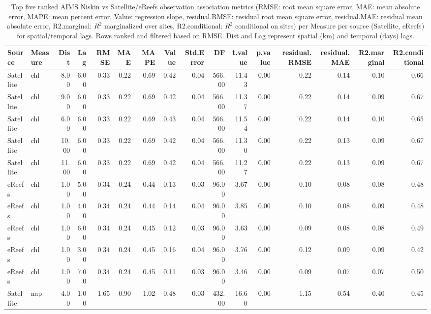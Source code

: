 \begin{table}[ht]
\centering
\caption{Top five ranked AIMS Niskin vs Satellite/eReefs observation association metrics (RMSE: root mean square error, MAE: mean absolute error, MAPE: mean percent error, Value: regression slope, residual.RMSE: residual root mean square error, residual.MAE: residual mean absolute error, R2.marginal: $R^2$ marginalized over sites, R2.conditional: $R^2$ conditional on sites) per Measure per source (Satellite, eReefs) for spatial/temporal lags.  Rows ranked and filtered based on RMSE. Dist and Lag represent spatial (km) and temporal (days) lags.} 
\label{tab:comp.all.rmse.sum.max}
\begingroup\scriptsize
\begin{tabular}{llrrrrrrrrrrrrrr}
  \toprule
Source & Measure & Dist & Lag & RMSE & MAE & MAPE & Value & Std.Error & DF & t.value & p.value & residual.RMSE & residual.MAE & R2.marginal & R2.conditional \\ 
  \midrule
Satellite & chl & 8.00 & 6.00 & 0.33 & 0.22 & 0.69 & 0.42 & 0.04 & 566.00 & 11.43 & 0.00 & 0.22 & 0.14 & 0.10 & 0.66 \\ 
  Satellite & chl & 9.00 & 6.00 & 0.33 & 0.22 & 0.69 & 0.42 & 0.04 & 566.00 & 11.37 & 0.00 & 0.22 & 0.14 & 0.09 & 0.67 \\ 
  Satellite & chl & 6.00 & 6.00 & 0.33 & 0.22 & 0.69 & 0.43 & 0.04 & 566.00 & 11.54 & 0.00 & 0.22 & 0.14 & 0.10 & 0.65 \\ 
  Satellite & chl & 10.00 & 6.00 & 0.33 & 0.22 & 0.69 & 0.42 & 0.04 & 566.00 & 11.30 & 0.00 & 0.22 & 0.13 & 0.09 & 0.67 \\ 
  Satellite & chl & 11.00 & 6.00 & 0.33 & 0.22 & 0.69 & 0.42 & 0.04 & 566.00 & 11.27 & 0.00 & 0.22 & 0.13 & 0.09 & 0.67 \\ 
  eReefs & chl & 1.00 & 5.00 & 0.34 & 0.24 & 0.44 & 0.13 & 0.03 & 96.00 & 3.67 & 0.00 & 0.10 & 0.08 & 0.08 & 0.48 \\ 
  eReefs & chl & 1.00 & 4.00 & 0.34 & 0.24 & 0.44 & 0.14 & 0.04 & 96.00 & 3.85 & 0.00 & 0.10 & 0.08 & 0.09 & 0.48 \\ 
  eReefs & chl & 1.00 & 6.00 & 0.34 & 0.24 & 0.45 & 0.12 & 0.03 & 96.00 & 3.63 & 0.00 & 0.09 & 0.08 & 0.08 & 0.49 \\ 
  eReefs & chl & 1.00 & 3.00 & 0.34 & 0.24 & 0.45 & 0.16 & 0.04 & 96.00 & 3.76 & 0.00 & 0.12 & 0.09 & 0.09 & 0.42 \\ 
  eReefs & chl & 1.00 & 7.00 & 0.34 & 0.24 & 0.45 & 0.11 & 0.03 & 96.00 & 3.46 & 0.00 & 0.09 & 0.07 & 0.07 & 0.50 \\ 
   \midrule
Satellite & nap & 4.00 & 1.00 & 1.65 & 0.90 & 1.02 & 0.48 & 0.03 & 432.00 & 16.60 & 0.00 & 1.15 & 0.54 & 0.40 & 0.45 \\ 

\end{tabular}
\end{table}
